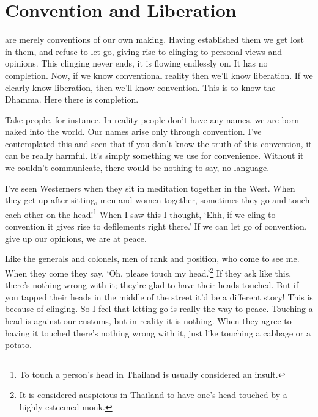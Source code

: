 

\chapter{Convention and Liberation}

 are merely conventions of our own making. Having established them we get lost in them, and refuse to let go, giving rise to clinging to personal views and opinions. This clinging never ends, it is  flowing endlessly on. It has no completion. Now, if we know conventional reality then we'll know liberation. If we clearly know liberation, then we'll know convention. This is to know the Dhamma. Here there is completion. 

Take people, for instance. In reality people don't have any names, we are born naked into the world. Our names arise only through convention. I've contemplated this and seen that if you don't know the truth of this convention, it can be really harmful. It's simply something we use for convenience. Without it we couldn't communicate, there would be nothing to say, no language. 

I've seen Westerners when they sit in meditation together in the West. When they get up after sitting, men and women together, sometimes they go and touch each other on the head!\footnote{To touch a person's head in Thailand is usually considered an insult. } When I saw this I thought, `Ehh, if we cling to convention it gives rise to defilements right there.' If we can let go of convention, give up our opinions, we are at peace. 

Like the generals and colonels, men of rank and position, who come to see me. When they come they say, `Oh, please touch my head.'\footnote{It is considered auspicious in Thailand to have one's head touched by a highly esteemed monk.} If they ask like this, there's nothing wrong with it; they're glad to have their heads touched. But if you tapped their heads in the middle of the street it'd be a different story! This is because of clinging. So I feel that letting go is really the way to peace. Touching a head is against our customs, but in reality it is nothing. When they agree to having it touched there's nothing wrong with it, just like touching a cabbage or a potato. 

